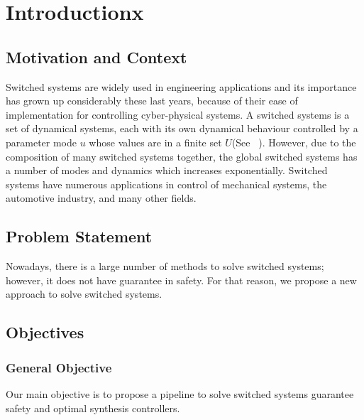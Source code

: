     \chapter{Introductionx}
    \section{Motivation and Context}

    Switched systems are widely used in engineering applications and its 
    importance has grown up considerably these last years, because of their 
    ease of implementation for controlling cyber-physical systems.
    A switched systems is a set of dynamical systems, each with its own 
    dynamical behaviour controlled by a parameter mode $u$ whose values 
    are in a finite set $U$(See ~\cite{liberzon2003switching}). However, due to the composition of many switched systems together, the global switched systems has a number of modes and dynamics which increases exponentially. 
    Switched systems have numerous applications in control of mechanical systems, the automotive industry, and many other fields. 

    \section{Problem Statement}
    Nowadays, there is a large number of methods to solve switched systems;
    however, it does not have guarantee in safety. For that reason, we 
    propose a new approach to solve switched systems. 
    
    \section{Objectives}

        \subsection*{General Objective}
        Our main objective is to propose a pipeline to solve switched systems guarantee safety and optimal synthesis controllers. 

